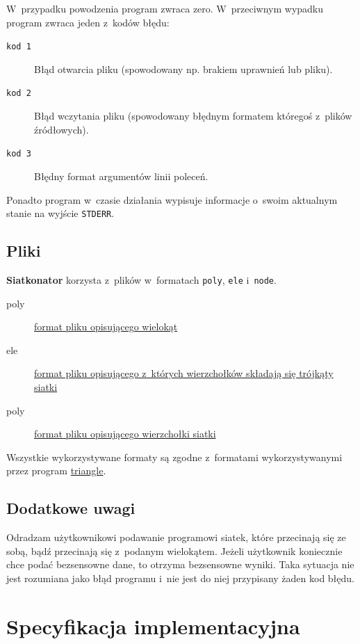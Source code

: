 \documentclass[a4paper]{article}
\newcommand{\siatkonator}{\textbf{Siatkonator} }
\renewcommand{\triangle}{\href{http://www.cs.cmu.edu/~quake/triangle.html}{triangle}}
\begin{document}
W~przypadku powodzenia program zwraca zero. W~przeciwnym wypadku program zwraca jeden z~kodów błędu:

\begin{description}
  \item[\texttt{kod 1}] Błąd otwarcia pliku (spowodowany np. brakiem uprawnień lub pliku).
  \item[\texttt{kod 2}] Błąd wczytania pliku (spowodowany błędnym formatem któregoś z~plików źródłowych).
  \item[\texttt{kod 3}] Błędny format argumentów linii poleceń.
\end{description}

Ponadto program w~czasie działania wypisuje informacje o~swoim aktualnym stanie na wyjście \texttt{STDERR}.

\subsection{Pliki}
\siatkonator korzysta z~plików w~formatach \texttt{poly}, \texttt{ele} i~\texttt{node}.

\begin{description}
  \item[poly] \href{http://www.cs.cmu.edu/~quake/triangle.poly.html}{format pliku opisującego wielokąt}
  \item[ele] \href{http://www.cs.cmu.edu/~quake/triangle.ele.html}{format pliku opisującego z~których wierzchołków składają się trójkąty siatki}
  \item[poly] \href{http://www.cs.cmu.edu/~quake/triangle.poly.html}{format pliku opisującego wierzchołki siatki}
\end{description}

Wszystkie wykorzystywane formaty są zgodne z~formatami wykorzystywanymi przez program \triangle.

\subsection{Dodatkowe uwagi}
Odradzam użytkownikowi podawanie programowi siatek, które przecinają się ze sobą, bądź przecinają się z~podanym wielokątem.
Jeżeli użytkownik koniecznie chce podać bezsensowne dane, to otrzyma bezsensowne wyniki.
Taka sytuacja nie jest rozumiana jako błąd programu i~nie jest do niej przypisany żaden kod błędu.

\newpage
\section{Specyfikacja implementacyjna}
\end{document}
